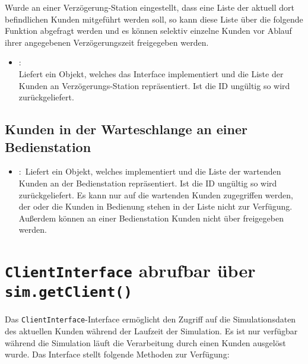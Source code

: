Wurde an einer Verzögerung-Station eingestellt, dass eine Liste der aktuell dort befindlichen Kunden
mitgeführt werden soll, so kann diese Liste über die folgende Funktion abgefragt werden und es können
selektiv einzelne Kunden vor Ablauf ihrer angegebenen Verzögerungszeit freigegeben werden.

\begin{itemize}

\item
{}:\\
Liefert ein Objekt, welches das Interface  implementiert und die Liste
der Kunden an Verzögerungs-Station  repräsentiert. Ist die ID ungültig
so wird  zurückgeliefert. 

\end{itemize}

\section{Kunden in der Warteschlange an einer Bedienstation}

\begin{itemize}

  \item
  :\
  Liefert ein Objekt, welches  implementiert und die Liste der wartenden
  Kunden an der Bedienstation \cm{id} repräsentiert. Ist die ID ungültig
  so wird \cm{null} zurückgeliefert. Es kann nur auf die wartenden Kunden zugegriffen werden,
  der oder die Kunden in Bedienung stehen in der Liste nicht zur Verfügung. 
  Außerdem können an einer Bedienstation Kunden nicht über 
  freigegeben werden.
  
\end{itemize}



\chapter{\texttt{ClientInterface} abrufbar über \texttt{sim.getClient()}}

Das \texttt{ClientInterface}-Interface ermöglicht den Zugriff auf die Simulationsdaten des aktuellen Kunden während
der Laufzeit der Simulation. Es ist nur verfügbar während die Simulation läuft die Verarbeitung durch
einen Kunden ausgelöst wurde. Das Interface stellt folgende Methoden zur Verfügung:

